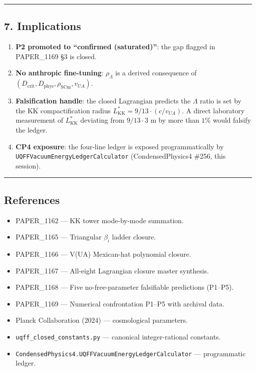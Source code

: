 \documentclass[
]{article}
\providecommand{\tightlist}{%
  \setlength{\itemsep}{0pt}\setlength{\parskip}{0pt}}
\begin{document}
\begin{center}\rule{0.5\linewidth}{0.5pt}\end{center}

\subsection{7. Implications}\label{implications}

\begin{enumerate}
\def\labelenumi{\arabic{enumi}.}
\tightlist
\item
  \textbf{P2 promoted to ``confirmed (saturated)''}: the gap flagged in
  PAPER\_1169 §3 is closed.
\item
  \textbf{No anthropic fine-tuning}: \(\rho_{\Lambda}\) is a derived
  consequence of
  \((D_{\mathrm{crit}}, D_{\mathrm{phys}}, \rho_{\mathrm{SCm}}, v_{UA})\).
\item
  \textbf{Falsification handle}: the closed Lagrangian predicts the
  \(\Lambda\) ratio is set by the KK compactification radius
  \(L_{\mathrm{KK}}^{*} = 9/13\cdot(c/v_{UA})\). A direct laboratory
  measurement of \(L_{\mathrm{KK}}^{*}\) deviating from \(9/13\cdot 3\)
  m by more than \(1\%\) would falsify the ledger.
\item
  \textbf{CP4 exposure}: the four-line ledger is exposed
  programmatically by \texttt{UQFFVacuumEnergyLedgerCalculator}
  (CondensedPhysics4 \#256, this session).
\end{enumerate}

\begin{center}\rule{0.5\linewidth}{0.5pt}\end{center}

\subsection{References}\label{references}

\begin{itemize}
\tightlist
\item
  PAPER\_1162 --- KK tower mode-by-mode summation.
\item
  PAPER\_1165 --- Triangular \(\beta_{i}\) ladder closure.
\item
  PAPER\_1166 --- V(UA) Mexican-hat polynomial closure.
\item
  PAPER\_1167 --- All-eight Lagrangian closure master synthesis.
\item
  PAPER\_1168 --- Five no-free-parameter falsifiable predictions
  (P1--P5).
\item
  PAPER\_1169 --- Numerical confrontation P1--P5 with archival data.
\item
  Planck Collaboration (2024) --- cosmological parameters.
\item
  \texttt{uqff\_closed\_constants.py} --- canonical integer-rational
  constants.
\item
  \texttt{CondensedPhysics4.UQFFVacuumEnergyLedgerCalculator} ---
  programmatic ledger.
\end{itemize}




\end{document}
